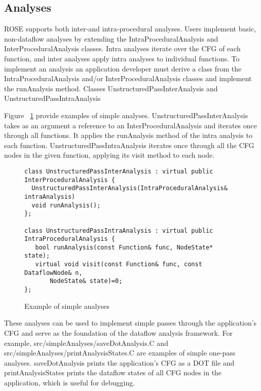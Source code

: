 \subsection{Analyses}
ROSE supports both inter-and intra-procedural analyses. Users implement basic, non-dataflow analyses by extending the {\scriptsize IntraProceduralAnalysis} and {\scriptsize InterProceduralAnalysis} classes. Intra analyses iterate over the CFG of each function, and inter analyses apply intra analyses to individual functions. To implement an analysis an application developer must derive a class from the {\scriptsize IntraProceduralAnalysis} and/or {\scriptsize InterProceduralAnalysis} classes and implement the {\scriptsize runAnalysis} method. Classes {\scriptsize UnstructuredPassInterAnalysis} and {\scriptsize UnstructuredPassIntraAnalysis} {Figure ~\ref{unstruct-ex} provide examples of simple analyses. {\scriptsize UnstructuredPassInterAnalysis} takes as an argument a reference to an {\scriptsize InterProceduralAnalysis} and iterates once through all functions. It applies the {\scriptsize runAnalysis} method of the intra analysis to each function. {\scriptsize UnstructuredPassIntraAnalysis} iterates once through all the CFG nodes in the given function, applying its {\scriptsize visit} method to each node.


\begin{figure}
\centering
\begin{lstlisting}
class UnstructuredPassInterAnalysis : virtual public InterProceduralAnalysis {
  UnstructuredPassInterAnalysis(IntraProceduralAnalysis& intraAnalysis)
  void runAnalysis();
};

class UnstructuredPassIntraAnalysis : virtual public IntraProceduralAnalysis {
   bool runAnalysis(const Function& func, NodeState* state);
   virtual void visit(const Function& func, const DataflowNode& n, 
       NodeState& state)=0;
};  
\end{lstlisting}%
\caption{Example of simple analyses}
\label{unstruct-ex}
\end{figure}

These analyses can be used to implement simple passes through the application’s CFG and serve as the foundation of the dataflow analysis framework. For example, {\scriptsize src/simpleAnalyses/saveDotAnalysis.C} and {\scriptsize src/simpleAnalyses/printAnalysisStates.C} are examples of simple one-pass analyses. {\scriptsize saveDotAnalysis} prints the application’s CFG as a DOT file and {\scriptsize printAnalysisStates} prints the dataflow states of all CFG nodes in the application, which is useful for debugging.

}
